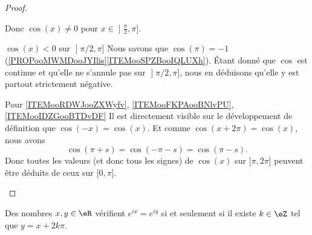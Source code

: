 \begin{proof}
\begin{subproof}
        Donc \( \cos(x)\neq 0\) pour \( x\in \mathopen] \frac{ \pi }{2} , \pi \mathclose]\).
    \item[\( \cos(x)<0\) sur \( {\mathopen] \pi/2 , \pi \mathclose]}\)]
    Nous savons que \( \cos(\pi)=-1\) (\ref{PROPooMWMDooJYIlis}\ref{ITEMooSPZBooIQLUXh}). Étant donné que \( \cos\) est continue et qu'elle ne s'annule pas sur \( \mathopen] \pi/2 , \pi \mathclose]\), nous en déduisons qu'elle y est partout strictement négative.
    \item[Pour \ref{ITEMooRDWJooZXWyfv}, \ref{ITEMooFKPAooBNlvPU}, \ref{ITEMooIDZGooBTDvDF}]
        Il est directement visible sur le développement de définition que \( \cos(-x)=\cos(x)\). Et comme \( \cos(x+2\pi)=\cos(x)\), nous avons
        \begin{equation}
            \cos(\pi+s)=\cos(-\pi-s)=\cos(\pi-s).
        \end{equation}
        Donc toutes les valeurs (et donc tous les signes) de \( \cos(x)\) sur \(\mathopen[ \pi , 2\pi \mathclose] \) peuvent être déduits de ceux sur \( \mathopen[ 0 , \pi \mathclose]\).
    \end{subproof}
\end{proof}

\begin{corollary}   \label{CORooTFMAooHDRrqi}
    Des nombres \( x,y\in \eR\) vérifient \(  e^{ix}= e^{iy}\) si et seulement si il existe \( k\in\eZ\) tel que \( y=x+2k\pi\).
\end{corollary}

